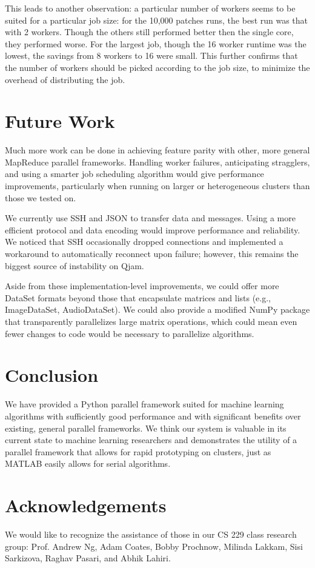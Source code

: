 \documentclass[%
  final,
  notitlepage,
  narroweqnarray,
  inline,
]{ieee}
\begin{document}
This leads to another observation: a particular number of workers seems to be
suited for a particular job size: for the 10,000 patches runs, the best run was
that with 2 workers. Though the others still performed better then the single
core, they performed worse. For the largest job, though the 16 worker runtime
was the lowest, the savings from 8 workers to 16 were small. This further
confirms that the number of workers should be picked according to the job size,
to minimize the overhead of distributing the job.

\section{Future Work}

Much more work can be done in achieving feature parity with other, more general
MapReduce parallel frameworks. Handling worker failures, anticipating
stragglers, and using a smarter job scheduling algorithm would give performance
improvements, particularly when running on larger or heterogeneous clusters
than those we tested on.

We currently use SSH and JSON to transfer data and messages. Using a more
efficient protocol and data encoding would improve performance and
reliability. We noticed that SSH occasionally dropped connections and
implemented a workaround to automatically reconnect upon failure; however, this
remains the biggest source of instability on Qjam.

Aside from these implementation-level improvements, we could offer more DataSet
formats beyond those that encapsulate matrices and lists (e.g., ImageDataSet,
AudioDataSet). We could also provide a modified NumPy package that
transparently parallelizes large matrix operations, which could mean even fewer
changes to code would be necessary to parallelize algorithms.


\section{Conclusion}

We have provided a Python parallel framework suited for machine learning
algorithms with sufficiently good performance and with significant benefits
over existing, general parallel frameworks. We think our system is valuable in
its current state to machine learning researchers and demonstrates the utility
of a parallel framework that allows for rapid prototyping on clusters, just as
MATLAB easily allows for serial algorithms.

\section{Acknowledgements}
We would like to recognize the assistance of those in our CS 229 class research
group: Prof. Andrew Ng, Adam Coates, Bobby Prochnow, Milinda Lakkam, Sisi
Sarkizova, Raghav Pasari, and Abhik Lahiri.




\end{document}
